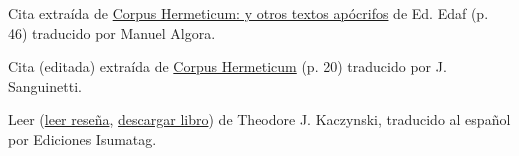 \documentclass{article}
\begin{document}
	\begin{thebibliography}{9}
		 Cita extraída de
		\href{https://books.google.com.co/books/about/Corpus_Hermeticum.html?hl=es&id=It8Jo57qFVgC}
		{Corpus Hermeticum: y otros textos apócrifos} de Ed. Edaf
		(p. 46) traducido por Manuel Algora.
		
		 Cita (editada) extraída de
		\href{http://www.ricardoego.com/libros/Corpus%20Hermeticum%20-%20Trismegisto%20Hermes.pdf}
		{Corpus Hermeticum} (p. 20) traducido por J. Sanguinetti. 

		 Leer 
		(\href{https://isumatag.blogspot.com/p/la-sociedad-industrial-y-su-futuro.html}
		{leer reseña},
		\href{http://libgen.rs/book/index.php?md5=F50ABA1457C931AA22DD7BC84D5A90C9}
		{descargar libro}) de Theodore J. Kaczynski, traducido al español por
		Ediciones Isumatag.
	\end{thebibliography}
\end{document}
